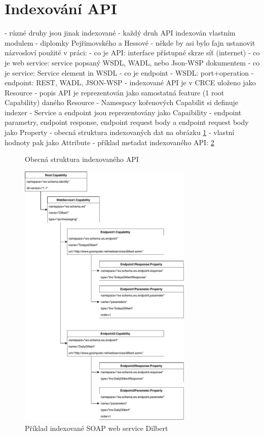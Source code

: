\documentclass[czech,DP]{thesiskiv}
\begin{document}
\section{Indexování API}
\label{sec:api-index}

- různé druhy jsou jinak indexované
- každý druh API indexován vlastním modulem - diplomky Pejřimovského \cite{pejrimovsky2015ws} a Hessové \cite{hessova2015rest}
- někde by asi bylo fajn ustanovit názvosloví použité v práci:
	- co je API: interface přístupné skrze síť (internet)
	- co je web service: service popsaný WSDL, WADL, nebo Json-WSP dokumentem
	- co je service: Service element in WSDL
	- co je endpoint
		- WSDL: port+operation
		- endpoint: REST, WADL, JSON-WSP
- indexované API je v CRCE uloženo jako Resource		
- popis API je reprezentován jako samostatná feature (1 root Capability) daného Resource
	- Namespacy kořenových Capabilit si definuje indexer
- Service a endpoint jsou reprezentovány jako Capaibility
- endpoint parametry, endpoint response, endpoint request body a endpoint request body jako Property
	- obecná struktura indexovaných dat na obrázku \ref{fig:indexed-api-general}
- vlastní hodnoty pak jako Attribute
- příklad metadat indexovaného API: \ref{fig:indexed-api-example}

\begin{figure}[h]
	\centering
	\caption{Obecná struktura indexovaného API}
	\label{fig:indexed-api-general}
\end{figure}

 \begin{figure}[h]
	\centering
	\includegraphics[height=13cm]{indexed-api-example}
	\caption{Příklad indexované SOAP web service Dilbert }
	\label{fig:indexed-api-example}
\end{figure}
\end{document}
